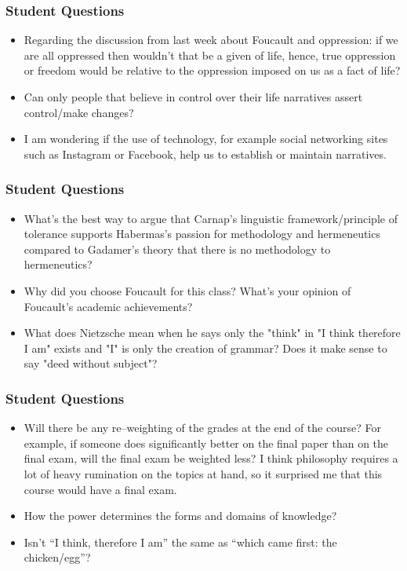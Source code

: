 \documentclass[xcolor=dvipsnames]{beamer}
\begin{document}
\begin{frame}
  \frametitle{Student Questions}
  \begin{itemize}
  \item Regarding the discussion from last week about Foucault and
    oppression: if we are all oppressed then wouldn't that be a given
    of life, hence, true oppression or freedom would be relative to
    the oppression imposed on us as a fact of life?
  \item Can only people that believe in control over their life
    narratives assert control/make changes?
  \item I am wondering if the use of technology, for example social
    networking sites such as Instagram or Facebook, help us to
    establish or maintain narratives.
  \end{itemize}
\end{frame}

\begin{frame}
  \frametitle{Student Questions}
  \begin{itemize}
  \item What's the best way to argue that Carnap's linguistic
    framework/principle of tolerance supports Habermas's passion for
    methodology and hermeneutics compared to Gadamer's theory that
    there is no methodology to hermeneutics?
  \item Why did you choose Foucault for this class? What's your
    opinion of Foucault's academic achievements?
  \item What does Nietzsche mean when he says only the "think" in "I
    think therefore I am" exists and "I" is only the creation of
    grammar? Does it make sense to say "deed without subject"?
  \end{itemize}
\end{frame}

\begin{frame}
  \frametitle{Student Questions}
  \begin{itemize}
  \item Will there be any re--weighting of the grades at the end of
    the course? For example, if someone does significantly better on
    the final paper than on the final exam, will the final exam be
    weighted less? I think philosophy requires a lot of heavy
    rumination on the topics at hand, so it surprised me that this
    course would have a final exam.
  \item How the power determines the forms and domains of knowledge?
  \item Isn't ``I think, therefore I am'' the same as ``which came
    first: the chicken/egg''?
  \end{itemize}
\end{frame}
\end{document}
